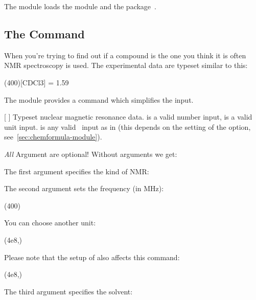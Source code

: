 \documentclass{chemmacros-manual}
\begin{document}
The  module loads the  module
and the  package~\cite{pkg:siunitx}.

\subsection{The  Command}

When you're trying to find out if a compound is the one you think it is often
NMR spectroscopy is used.  The experimental data are typeset similar to this:
\begin{center}
  \NMR(400)[CDCl3] = \num{1.59}
\end{center}
The  module provides a command which simplifies the
input.

\begin{commands}
  [\sarg{}%
    ]
    Typeset nuclear magnetic resonance data.  is a valid
     number input,  is a valid  unit
    input.   is any valid \chemformula\ input as in 
    (this depends on the setting of the  option,
    see~\vref{sec:chemformula-module}).
\end{commands}

\emph{All} Argument are optional! Without arguments we get:
\begin{example}
  \NMR \par
  \NMR*
\end{example}

The first argument specifies the kind of NMR:
\begin{example}
\end{example}

The second argument sets the frequency (in \si{\mega\hertz}):
\begin{example}
  \NMR(400)
\end{example}
You can choose another unit:
\begin{example}
  \NMR(4e8,\hertz)
\end{example}
Please note that the setup of  also affects this command:
\begin{example}
  \NMR(4e8,\hertz)
\end{example}

The third argument specifies the solvent:
\begin{example}
  \NMR[CDCl3]
\end{example}
\end{document}
